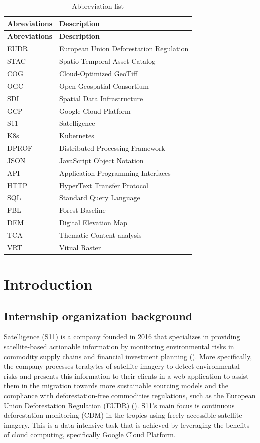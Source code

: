 \documentclass[
  oneside,
  open=any]{scrbook}
\begin{document}
\begin{longtable}[]{@{}ll@{}}
\caption{Abbreviation list}\tabularnewline
\toprule\noalign{}
\textbf{Abreviations} & \textbf{Description} \\
\midrule\noalign{}
\endfirsthead
\toprule\noalign{}
\textbf{Abreviations} & \textbf{Description} \\
\midrule\noalign{}
\endhead
\bottomrule\noalign{}
\endlastfoot
EUDR & European Union Deforestation Regulation \\
STAC & Spatio-Temporal Asset Catalog \\
COG & Cloud-Optimized GeoTiff \\
OGC & Open Geospatial Consortium \\
SDI & Spatial Data Infrastructure \\
GCP & Google Cloud Platform \\
S11 & Satelligence \\
K8s & Kubernetes \\
DPROF & Distributed Processing Framework \\
JSON & JavaScript Object Notation \\
API & Application Programming Interfaces \\
HTTP & HyperText Transfer Protocol \\
SQL & Standard Query Language \\
FBL & Forest Baseline \\
DEM & Digital Elevation Map \\
TCA & Thematic Content analysis \\
VRT & Vitual Raster \\
\end{longtable}

\chapter{Introduction}\label{introduction}

\section{Internship organization
background}\label{internship-organization-background}

Satelligence (S11) is a company founded in 2016 that specializes in
providing satellite-based actionable information by monitoring
environmental risks in commodity supply chains and financial investment
planning ().
More specifically, the company processes terabytes of satellite imagery
to detect environmental risks and presents this information to their
clients in a web application to assist them in the migration towards
more sustainable sourcing models and the compliance with
deforestation-free commodities regulations, such as the European Union
Deforestation Regulation (EUDR)
(). S11's
main focus is continuous deforestation monitoring (CDM) in the tropics
using freely accessible satellite imagery. This is a data-intensive task
that is achieved by leveraging the benefits of cloud computing,
specifically Google Cloud Platform.
\end{document}
